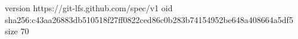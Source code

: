 version https://git-lfs.github.com/spec/v1
oid sha256:c43aa26883db510518f27ff0822ced86c0b283b74154952be648a408664a5df5
size 70
